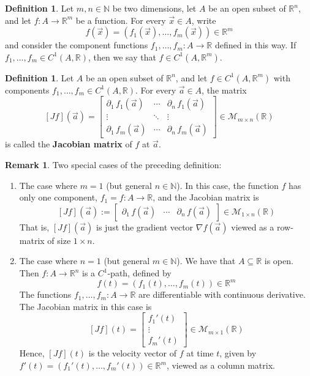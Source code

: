 \documentclass[11pt]{article}
\theoremstyle{definition}
\newtheorem{defn}[thm]{Definition}
\newtheorem{remark}[thm]{Remark}
\newcommand{\N}{\ensuremath{\mathbb{N}}}
\newcommand{\R}{\ensuremath{\mathbb{R}}}
\begin{document}
\begin{defn}
Let $m, n \in \N$ be two dimensions, let $A$ be an open subset of $\R^n$, and let $f : A \to \R^m$ be a function. For every $\vec{x} \in A$, write
$$f(\vec{x}) = (f_1(\vec{x}), \dots, f_m(\vec{x})) \in \R^m$$
and consider the component functions $f_1, \dots, f_m : A \to \R$ defined in this way. If $f_1, \dots, f_m \in C^1(A, \R)$, then we say that $f \in C^1(A, \R^m)$. 
\end{defn}

\begin{defn}
Let $A$ be an open subset of $\R^n$, and let $f \in C^1(A, \R^m)$ with components $f_1, \dots, f_m \in C^1(A, \R)$. For every $\vec{a} \in A$, the matrix
$$[Jf](\vec{a}) = \begin{bmatrix} \partial_1\,f_1(\vec{a}) & \cdots & \partial_n\,f_1(\vec{a}) \\ \vdots & \ddots & \vdots \\ \partial_1\,f_m(\vec{a}) & \cdots & \partial_n\,f_m(\vec{a}) \end{bmatrix} \in \mathcal{M}_{m\times n}(\R)$$
is called the {\bf Jacobian matrix} of $f$ at $\vec{a}$.
\end{defn}

\begin{remark}
Two special cases of the preceding definition:\vspace{-1.5ex}
\begin{enumerate}[(1)]
\item The case where $m = 1$ (but general $n \in \N$). In this case, the function $f$ has only one component, $f_1 = f : A \to \R$, and the Jacobian matrix is
$$[Jf](\vec{a}) := \begin{bmatrix} \partial_1\,f(\vec{a}) & \cdots & \partial_n\,f(\vec{a}) \end{bmatrix} \in \mathcal{M}_{1\times n}(\R)$$
That is, $[Jf](\vec{a})$ is just the gradient vector $\nabla f(\vec{a})$ viewed as a row-matrix of size $1 \times n$. 
\item The case where $n = 1$ (but general $m \in \N$). We have that $A \subseteq \R$ is open. Then $f : A \to \R^n$ is a $C^1$-path, defined by
$$f(t) = (f_1(t), \dots, f_m(t)) \in \R^m$$
The functions $f_1, \dots, f_m : A \to \R$ are differentiable with continuous derivative. The Jacobian matrix in this case is
$$[Jf](t) = \begin{bmatrix} f_1'(t) \\ \vdots \\ f_m'(t) \end{bmatrix} \in \mathcal{M}_{m\times1}(\R)$$
Hence, $[Jf](t)$ is the velocity vector of $f$ at time $t$, given by $f'(t) = (f_1'(t), \dots, f_m'(t)) \in \R^m$, viewed as a column matrix.
\end{enumerate}
\end{remark}
\end{document}
